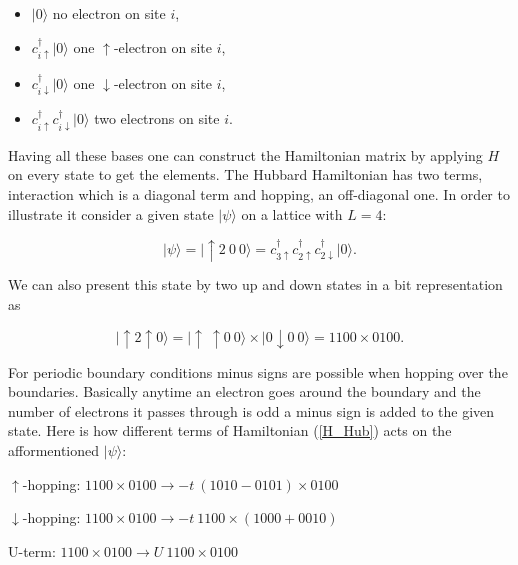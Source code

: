 \documentclass[article,11pt]{revtex4}
\begin{document}
\begin{itemize}
  \item $|0\rangle$ no electron on site $i$,
  \item $c^\dagger_{i\uparrow} |0\rangle$ one $\uparrow$-electron on site $i$,
  \item $c^\dagger_{i\downarrow} |0\rangle$ one $\downarrow$-electron on site $i$,
  \item $c^\dagger_{i\uparrow} c^\dagger_{i\downarrow} |0\rangle$ two electrons on site $i$.
\end{itemize}
  
Having all these bases one can construct the Hamiltonian matrix by applying $H$ on every state to get the elements. The Hubbard Hamiltonian has two terms, interaction which is a diagonal term and hopping, an off-diagonal one. In order to illustrate it consider a given state $| \psi \rangle$ on a lattice with $L=4$:

\begin{equation}
| \psi \rangle=| \uparrow 2 \ 0 \ 0 \rangle=c^\dagger_{3\uparrow} c^\dagger_{2\uparrow} c^\dagger_{2\downarrow}| 0 \rangle. \nonumber
\end{equation} 

We can also present this state by two up and down states in a bit representation as  

\begin{equation}
| \uparrow 2 \uparrow 0 \rangle=| \uparrow \ \uparrow 0 \ 0 \rangle \times | 0 \downarrow 0 \ 0 \rangle=1100 \times 0100. \nonumber
\end{equation} 

For periodic boundary conditions minus signs are possible when hopping over the boundaries. Basically anytime an electron goes around the boundary and the number of electrons it passes through is odd a minus sign is added to the given state. Here is how different terms of Hamiltonian (\ref{H_Hub}) acts on the afformentioned $| \psi \rangle$:

\begin{description}
  \item $\uparrow$-hopping: $1100 \times 0100 \rightarrow -t \ (1010 - 0101) \times 0100$ 
  \item $\downarrow$-hopping: $1100 \times 0100 \rightarrow -t \ 1100  \times (1000 + 0010)$
  \item U-term: $1100 \times 0100 \rightarrow U \ 1100 \times 0100$ 
\end{description}
\end{document}
